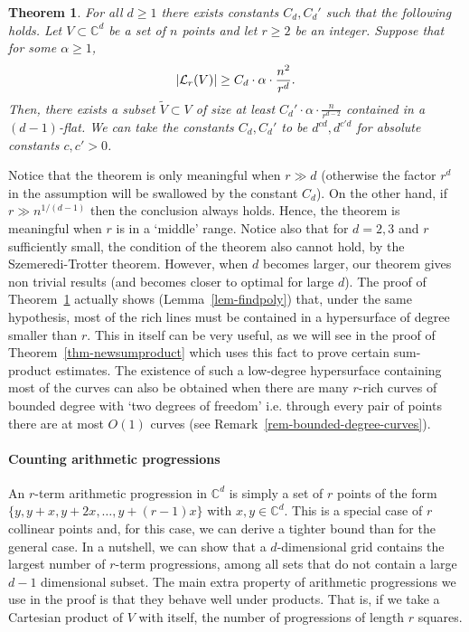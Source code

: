 \documentclass[11pt]{article}
\newtheorem{THM}{Theorem}
\def\C{{\mathbb{C}}}
\def\cL{{\cal L}}
\begin{document}
\begin{THM}\label{thm-manyrichlines}
For all $d \geq 1$ there exists constants $C_d,C_d'$ such that the following holds. Let $V \subset \C^d$ be a set of $n$ points and let $r \geq 2$ be an integer. Suppose that for some $\alpha\ge 1$, $$|\cL_r(V)|\ge C_d\cdot\alpha\cdot \frac{n^2}{r^{d}}.$$  Then, there exists a subset $\tilde V \subset V$ of size at least $C_d'\cdot\alpha\cdot \frac{n}{r^{d-2}}$  contained in a $(d-1)$-flat. We can take the constants $C_d,C_d'$ to be $d^{cd},d^{c'd}$ for  absolute constants $c,c'>0$.
\end{THM}

Notice that the theorem is only meaningful when $r \gg d$ (otherwise the factor $r^d$ in the assumption will be swallowed by the constant $C_d$). On the other hand, if $r \gg n^{1/(d-1)}$ then the conclusion always holds. Hence, the theorem is meaningful when $r$ is in a `middle' range. Notice also that for $d=2,3$ and $r$ sufficiently small, the condition of the theorem also cannot hold, by the Szemeredi-Trotter theorem. However, when $d$ becomes larger, our theorem gives non trivial results (and becomes closer to optimal for large $d$). The proof of Theorem~\ref{thm-manyrichlines} actually  shows (Lemma~\ref{lem-findpoly})  that, under the same hypothesis, most of the rich lines must be contained in a  hypersurface of degree smaller than $r$. This in itself can be very useful, as we will see in the proof of Theorem~\ref{thm-newsumproduct} which uses this fact to prove certain sum-product estimates. The existence of such a low-degree hypersurface containing most of the curves can also be obtained when there are many $r$-rich curves of bounded degree with `two degrees of freedom' i.e. through every pair of points there are at most $O(1)$ curves (see Remark~\ref{rem-bounded-degree-curves}).


\paragraph*{Counting arithmetic progressions}
 An $r$-term arithmetic progression in $\C^d$ is simply a set of $r$ points of the form $\{y,y+x,y+2x, \ldots,y+(r-1)x\}$ with $x,y \in \C^d$. This is a special case of $r$ collinear points and, for this case, we can derive a tighter bound than for the general case. In a nutshell, we can show that a $d$-dimensional grid contains the largest number of $r$-term progressions, among all sets that do not contain a large $d-1$ dimensional subset. The main extra property of  arithmetic progressions we use in the proof is that they behave well under products. That is, if we take a Cartesian product of $V$ with itself, the number of progressions of length $r$ squares. 
\end{document}

